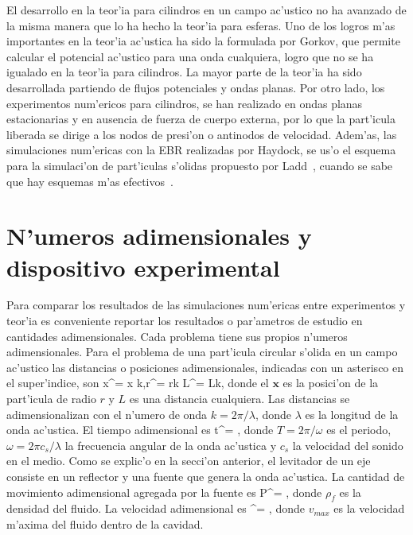 El desarrollo en la teor'ia para cilindros en un campo ac'ustico no ha avanzado de la misma manera
que lo ha hecho la teor'ia para esferas. Uno de los logros m'as importantes en la teor'ia ac'ustica
ha sido la formulada por Gorkov, que permite calcular el potencial ac'ustico para una onda cualquiera, logro
que no se ha igualado en la teor'ia para cilindros. La mayor parte de la teor'ia ha sido desarrollada partiendo de
flujos potenciales y ondas planas. Por otro lado, los experimentos num'ericos para cilindros, se han realizado
en ondas planas estacionarias y en ausencia de fuerza de cuerpo externa, por lo que la part'icula liberada
se dirige a los nodos de presi'on o antinodos de velocidad. Adem'as, las simulaciones num'ericas con la EBR
realizadas por Haydock, se us'o el esquema para la simulaci'on de part'iculas s'olidas propuesto por 
Ladd~\cite{ladd94,ladd94b}, cuando se sabe que hay esquemas m'as efectivos~\cite{aidun98}.
 



\section{N'umeros adimensionales y dispositivo experimental}
\label{sec:adimensionales}

Para comparar los  resultados de las simulaciones num'ericas entre experimentos y teor'ia
es conveniente reportar los resultados o par'ametros de estudio en cantidades adimensionales. 
Cada problema tiene sus propios n'umeros adimensionales. Para el problema de una part'icula circular
s'olida en un campo ac'ustico las distancias o posiciones adimensionales, indicadas con un
asterisco en el super'indice, son
\BE
\mathbf x^\ast = \mathbf x k,\qquad r^\ast = rk \qquad L^\ast = Lk,
\EE
donde el $\mathbf x$ es la posici'on de la part'icula de radio $r$ y $L$ es una
distancia cualquiera. Las distancias se adimensionalizan con el n'umero de onda $k= 2\pi/\lambda$,
donde $\lambda$ es la longitud de la onda ac'ustica. El tiempo adimensional es
\BE
t^\ast = ,
\EE  
donde $T=2\pi/\omega$ es el periodo, $\omega=2\pi c_s/\lambda$ la frecuencia angular de la
onda ac'ustica y $c_s$ la velocidad del sonido en el medio. Como se explic'o en la secci'on anterior,
el levitador de un eje consiste en un reflector y una fuente que genera la onda ac'ustica. La cantidad
de movimiento adimensional agregada por la fuente es
\BE
P^\ast = ,
\EE
donde $\rho_f$ es la densidad del fluido. La velocidad adimensional es
\BE
\vu^\ast = ,
\EE
donde $v_{max}$ es la velocidad m'axima del fluido dentro de la cavidad.




